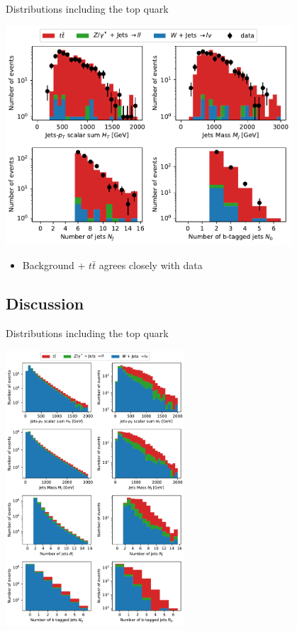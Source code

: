 \documentclass{beamer}
\begin{document}
\begin{frame}{Distributions including the top quark}
\begin{center}
\includegraphics[width=0.8\textwidth]{post_tt.pdf}
\end{center}

\begin{itemize}
    \item<1-> Background + $t\bar{t}$ agrees closely with data
\end{itemize}
\end{frame}

\subsection{Discussion}
\begin{frame}{Distributions including the top quark}
\begin{center}
\includegraphics[width=0.5\textwidth]{mc_tt.pdf}
\end{center}
\end{frame}
\end{document}
